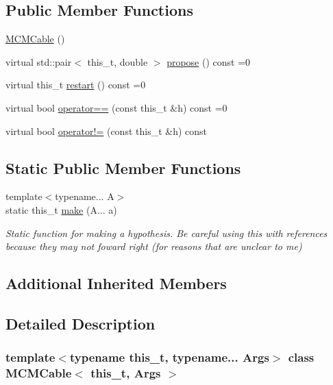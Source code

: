 \subsection*{Public Member Functions}
\begin{DoxyCompactItemize}
\item 
\hyperlink{class_m_c_m_cable_a3bc2cc7dd7cf2385ade7c82a51f3a566}{M\+C\+M\+Cable} ()
\item 
virtual std\+::pair$<$ this\+\_\+t, double $>$ \hyperlink{class_m_c_m_cable_a98b52f1867ea0d72c1c91b4496d756d2}{propose} () const =0
\item 
virtual this\+\_\+t \hyperlink{class_m_c_m_cable_aa7017e18b4a1508bc4cff90fb82a8ec1}{restart} () const =0
\item 
virtual bool \hyperlink{class_m_c_m_cable_a7b35c04d3d1326b930cfc69dfe0bd207}{operator==} (const this\+\_\+t \&h) const =0
\item 
virtual bool \hyperlink{class_m_c_m_cable_a73f816785855f80f5d102528aa671f4b}{operator!=} (const this\+\_\+t \&h) const
\end{DoxyCompactItemize}
\subsection*{Static Public Member Functions}
\begin{DoxyCompactItemize}
\item 
{\footnotesize template$<$typename... A$>$ }\\static this\+\_\+t \hyperlink{class_m_c_m_cable_a75b545fc2afd188bfdd199a7256eeed9}{make} (A... a)
\begin{DoxyCompactList}\small\item\em Static function for making a hypothesis. Be careful using this with references because they may not foward right (for reasons that are unclear to me) \end{DoxyCompactList}\end{DoxyCompactItemize}
\subsection*{Additional Inherited Members}


\subsection{Detailed Description}
\subsubsection*{template$<$typename this\+\_\+t, typename... Args$>$\newline
class M\+C\+M\+Cable$<$ this\+\_\+t, Args $>$}

